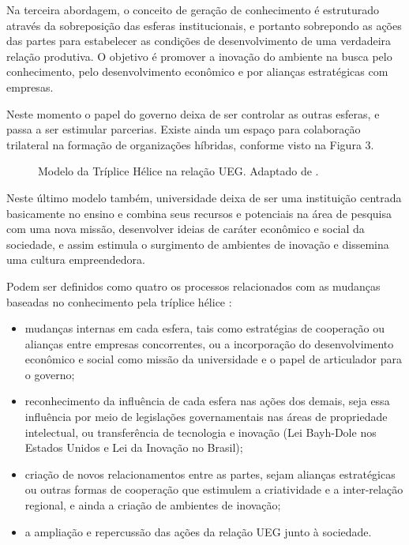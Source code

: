 Na terceira abordagem, o conceito de geração de conhecimento é estruturado através da sobreposição das esferas institucionais, e portanto sobrepondo as ações das partes para estabelecer as condições de desenvolvimento de uma verdadeira relação produtiva. O objetivo é promover a inovação do ambiente na busca pelo conhecimento, pelo desenvolvimento econômico e por alianças estratégicas com empresas.

Neste momento o papel do governo deixa de ser controlar as outras esferas, e passa a ser estimular parcerias. Existe ainda um espaço para colaboração trilateral na formação de organizações híbridas, conforme visto na Figura 3.


\begin{figure}[ht]
  \centering
  \caption{Modelo da Tríplice Hélice na relação UEG. Adaptado de \cite{etzkowitz2003innovation}.}
  \label{crescimento_odf}
\end{figure}

Neste último modelo também, universidade deixa de ser uma instituição centrada basicamente no ensino e combina seus recursos e potenciais na área de pesquisa com uma nova missão, desenvolver ideias de caráter econômico e social da sociedade, e assim estimula o surgimento de ambientes de inovação e dissemina uma cultura empreendedora.

Podem ser definidos como quatro os processos relacionados com as mudanças baseadas no conhecimento pela tríplice hélice \cite{etzkowitz2003innovation}:

\begin{itemize}
  \item{mudanças internas em cada esfera, tais como estratégias de cooperação ou alianças entre empresas concorrentes, ou a incorporação do desenvolvimento econômico e social como missão da universidade e o papel de articulador para o governo;}
  \item{reconhecimento da influência de cada esfera nas ações dos demais, seja essa influência por meio de legislações governamentais nas áreas de propriedade intelectual, ou transferência de tecnologia e inovação (Lei Bayh-Dole nos Estados Unidos e Lei da Inovação no Brasil);}
  \item{criação de novos relacionamentos entre as partes, sejam alianças estratégicas ou outras formas de cooperação que estimulem a criatividade e a inter-relação regional, e ainda a criação de ambientes de inovação;}
  \item{a ampliação e repercussão das ações da relação UEG junto à sociedade.}
\end{itemize}

